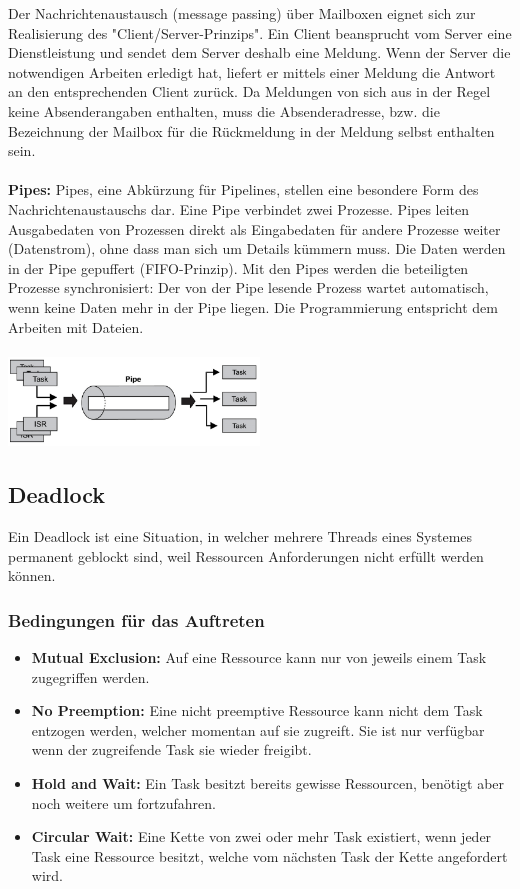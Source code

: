 Der Nachrichtenaustausch (message passing) über Mailboxen eignet sich zur Realisierung des "Client/Server-Prinzips". Ein Client beansprucht vom Server eine Dienstleistung und sendet dem Server deshalb eine Meldung. Wenn der Server die notwendigen Arbeiten erledigt hat, liefert er mittels einer Meldung die Antwort an den entsprechenden Client zurück. Da Meldungen von sich aus in der Regel keine Absenderangaben enthalten, muss die Absenderadresse, bzw. die Bezeichnung der Mailbox für die Rückmeldung in der Meldung selbst enthalten sein.\\\\
\textbf{Pipes:} Pipes, eine Abkürzung für Pipelines, stellen eine besondere Form des Nachrichtenaustauschs dar. Eine Pipe verbindet zwei Prozesse. Pipes leiten Ausgabedaten von Prozessen direkt als Eingabedaten für andere
Prozesse weiter (Datenstrom), ohne dass man sich um Details kümmern muss. Die Daten werden in der Pipe gepuffert (FIFO-Prinzip). Mit den Pipes werden die beteiligten Prozesse synchronisiert: Der von der Pipe lesende Prozess wartet automatisch, wenn keine Daten mehr in der Pipe liegen. Die Programmierung entspricht dem Arbeiten mit Dateien.\\\\
\includegraphics[width=0.5\textwidth]{images/Betriebssysteme/Pipe.png}


\subsection{Deadlock}
Ein Deadlock ist eine Situation, in welcher mehrere Threads eines Systemes permanent geblockt sind, weil Ressourcen Anforderungen nicht erfüllt werden können.

\subsubsection{Bedingungen für das Auftreten}
\begin{itemize}
    \item \textbf{Mutual Exclusion:} Auf eine Ressource kann nur von jeweils einem Task zugegriffen werden.
    \item \textbf{No Preemption:} Eine nicht preemptive Ressource kann nicht dem Task entzogen werden, welcher momentan auf sie zugreift. Sie ist nur verfügbar wenn der zugreifende Task sie wieder freigibt.
    \item \textbf{Hold and Wait:} Ein Task besitzt bereits gewisse Ressourcen, benötigt aber noch weitere um fortzufahren.
    \item \textbf{Circular Wait:} Eine Kette von zwei oder mehr Task existiert, wenn jeder Task eine Ressource besitzt, welche vom nächsten Task der Kette angefordert wird.
\end{itemize}

